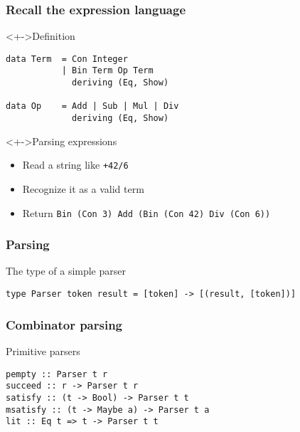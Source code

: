 \documentclass{beamer}
\subtitle
{Parsing}
\begin{document}
\begin{frame}
  \titlepage
\end{frame}



\begin{frame}[fragile]
  \frametitle{Recall the expression language}
\begin{block}<+->{Definition}
\begin{verbatim}
data Term  = Con Integer
           | Bin Term Op Term  
             deriving (Eq, Show)
           
data Op    = Add | Sub | Mul | Div
             deriving (Eq, Show)
\end{verbatim}
\end{block}
\begin{alertblock}<+->{Parsing expressions}
  \begin{itemize}
  \item Read a string like \texttt{+42/6\dq}
  \item Recognize it as a valid term
  \item Return \texttt{Bin (Con 3) Add (Bin (Con 42) Div (Con 6))} 
  \end{itemize}
\end{alertblock}
\end{frame}             

\begin{frame}[fragile]
  \frametitle{Parsing}
\begin{block}{The type of a simple parser}
\begin{verbatim}
type Parser token result = [token] -> [(result, [token])]
\end{verbatim}  
\end{block}
\end{frame}             

\begin{frame}[fragile]
  \frametitle{Combinator parsing}
  \begin{block}{Primitive parsers}
\begin{verbatim}
pempty :: Parser t r
succeed :: r -> Parser t r
satisfy :: (t -> Bool) -> Parser t t
msatisfy :: (t -> Maybe a) -> Parser t a
lit :: Eq t => t -> Parser t t
\end{verbatim}
  \end{block}
\end{frame}
\end{document}

